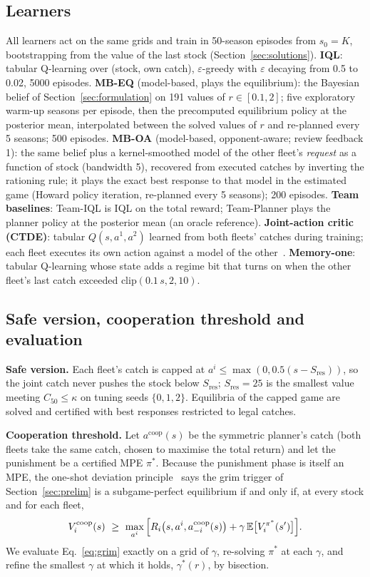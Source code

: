 \subsection{Learners}
All learners act on the same grids and train in 50-season episodes from $s_0=K$, bootstrapping from the value of the
last stock (Section~\ref{sec:solutions}).
\textbf{IQL}: tabular Q-learning over (stock, own catch), $\varepsilon$-greedy with $\varepsilon$ decaying from 0.5 to
0.02, 5000 episodes.
\textbf{MB-EQ} (model-based, plays the equilibrium): the Bayesian belief of Section~\ref{sec:formulation} on 191 values of
$r\in[0.1,2]$; five exploratory warm-up seasons per episode, then the precomputed equilibrium policy at the posterior mean,
interpolated between the solved values of $r$ and re-planned every 5 seasons; 500 episodes.
\textbf{MB-OA} (model-based, opponent-aware; review feedback 1): the same belief plus a kernel-smoothed model of the other
fleet's \emph{request} as a function of stock (bandwidth 5), recovered from executed catches by inverting the rationing
rule; it plays the exact best response to that model in the estimated game (Howard policy iteration, re-planned every 5
seasons); 200 episodes.
\textbf{Team baselines}: Team-IQL is IQL on the total reward; Team-Planner plays the planner policy at the posterior mean
(an oracle reference).
\textbf{Joint-action critic (CTDE)}: tabular $Q(s,a^1,a^2)$ learned from both fleets' catches during training; each fleet
executes its own action against a model of the other~\cite{claus1998}.
\textbf{Memory-one}: tabular Q-learning whose state adds a regime bit that turns on when the other fleet's last catch
exceeded $\mathrm{clip}(0.1\,s,2,10)$.

\subsection{Safe version, cooperation threshold and evaluation}
\textbf{Safe version.} Each fleet's catch is capped at $a^i\le\max(0,0.5(s-S_{\mathrm{res}}))$, so the joint catch never
pushes the stock below $S_{\mathrm{res}}$; $S_{\mathrm{res}}=25$ is the smallest value meeting $C_{50}\le\kappa$ on
tuning seeds $\{0,1,2\}$. Equilibria of the capped game are solved and certified with best responses restricted to legal
catches.

\textbf{Cooperation threshold.} Let $a^{\mathrm{coop}}(s)$ be the symmetric planner's catch (both fleets take the same
catch, chosen to maximise the total return) and let the punishment be a certified MPE $\pi^*$. Because the punishment
phase is itself an MPE, the one-shot deviation principle~\cite{fudenberg1986,abreu1988} says the grim trigger of
Section~\ref{sec:prelim} is a subgame-perfect equilibrium if and only if, at every stock and for each fleet,
\begin{equation}\label{eq:grim}
V_i^{\mathrm{coop}}(s)\ \ge\ \max_{a^i}\Big[R_i\big(s,a^i,a^{\mathrm{coop}}_{-i}(s)\big)+\gamma\,\E\big[V_i^{\pi^*}(s')\big]\Big].
\end{equation}
We evaluate Eq.~\eqref{eq:grim} exactly on a grid of $\gamma$, re-solving $\pi^*$ at each $\gamma$, and refine the
smallest $\gamma$ at which it holds, $\gamma^*(r)$, by bisection.

